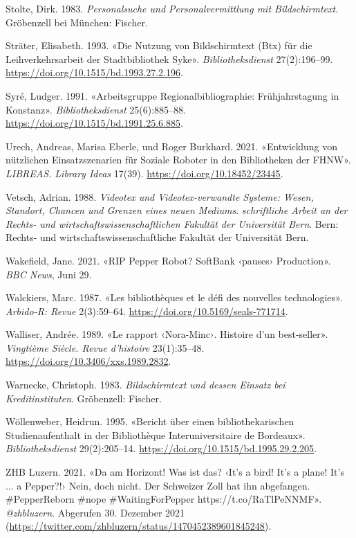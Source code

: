 \documentclass[a4paper,
fontsize=11pt,
oneside,
numbers=noperiodatend,
parskip=half-,
bibliography=totoc,
final
]{scrartcl}
\begin{document}
Stolte, Dirk. 1983. \emph{Personalsuche und Personalvermittlung mit
Bildschirmtext}. Gröbenzell bei München: Fischer.

Sträter, Elisabeth. 1993. «Die Nutzung von Bildschirmtext (Btx) für die
Leihverkehrsarbeit der Stadtbibliothek Syke». \emph{Bibliotheksdienst}
27(2):196--99. \url{https://doi.org/10.1515/bd.1993.27.2.196}.

Syré, Ludger. 1991. «Arbeitsgruppe Regionalbibliographie:
Frühjahrstagung in Konstanz». \emph{Bibliotheksdienst} 25(6):885--88.
\url{https://doi.org/10.1515/bd.1991.25.6.885}.

Urech, Andreas, Marisa Eberle, und Roger Burkhard. 2021. «Entwicklung
von nützlichen Einsatzszenarien für Soziale Roboter in den Bibliotheken
der FHNW». \emph{LIBREAS. Library Ideas} 17(39).
\url{https://doi.org/10.18452/23445}.

Vetsch, Adrian. 1988. \emph{Videotex und Videotex-verwandte Systeme:
Wesen, Standort, Chancen und Grenzen eines neuen Mediums}.
\emph{schriftliche Arbeit an der Rechts- und
wirtschaftswissenschaftlichen Fakultät der Universität Bern}. Bern:
Rechts- und wirtschaftswissenschaftliche Fakultät der Universität Bern.

Wakefield, Jane. 2021. «RIP Pepper Robot? SoftBank ‹pauses› Production».
\emph{BBC News}, Juni 29.

Walckiers, Marc. 1987. «Les bibliothèques et le défi des nouvelles
technologies». \emph{Arbido-R: Revue} 2(3):59--64.
\url{https://doi.org/10.5169/seals-771714}.

Walliser, Andrée. 1989. «Le rapport ‹Nora-Minc›. Histoire d'un
best-seller». \emph{Vingtième Siècle. Revue d'histoire} 23(1):35--48.
\url{https://doi.org/10.3406/xxs.1989.2832}.

Warnecke, Christoph. 1983. \emph{Bildschirmtext und dessen Einsatz bei
Kreditinstituten}. Gröbenzell: Fischer.

Wöllenweber, Heidrun. 1995. «Bericht über einen bibliothekarischen
Studienaufenthalt in der Bibliothèque Interuniversitaire de Bordeaux».
\emph{Bibliotheksdienst} 29(2):205--14.
\url{https://doi.org/10.1515/bd.1995.29.2.205}.

ZHB Luzern. 2021. «Da am Horizont! Was ist das? ‹It's a bird! It's a
plane! It's ... a Pepper?!› Nein, doch nicht. Der Schweizer Zoll hat ihn
abgefangen. \#PepperReborn \#nope \#WaitingForPepper
https://t.co/RaTlPeNNMF». \emph{@zhbluzern}. Abgerufen 30. Dezember 2021
(\url{https://twitter.com/zhbluzern/status/1470452389601845248}).
\end{document}

